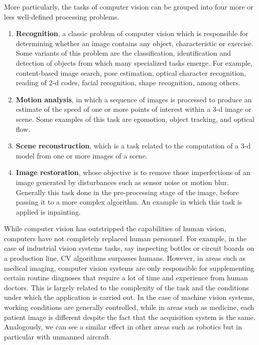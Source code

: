 More particularly, the tasks of computer vision can be grouped into four more or less well-defined processing problems.

\begin{enumerate}[label=\roman*]
	\item \textbf{Recognition}, a classic problem of computer vision which is responsible for determining whether an image contains any object, characteristic or exercise. Some variants of this problem are the classification, identification and detection of objects from which many specialized tasks emerge. For example, content-based image search, pose estimation, optical character recognition, reading of 2-d codes, facial recognition, shape recognition, among others.
	\item \textbf{Motion analysis}, in which a sequence of images is processed to produce an estimate of the speed of one or more points of interest within a 3-d image or scene. Some examples of this task are egomotion, object tracking, and optical flow.
	\item \textbf{Scene reconstruction}, which is a task related to the computation of a 3-d model from one or more images of a scene.
	\item \textbf{Image restoration}, whose objective is to remove those imperfections of an image generated by disturbances such as sensor noise or motion blur. Generally this task done in the pre-processing stage of the image, before passing it to a more complex algorithm. An example in which this task is applied is inpainting.
\end{enumerate}

While computer vision has outstripped the capabilities of human vision, computers have not completely replaced human personnel. For example, in the case of industrial vision systems tasks, say inspecting bottles or circuit boards on a production line, CV algorithms surpasses humans. However, in areas such as medical imaging, computer vision systems are only responsible for supplementing certain routine diagnoses that require a lot of time and experience from human doctors. This is largely related to the complexity of the task and the conditions under which the application is carried out. In the case of machine vision systems, working conditions are generally controlled, while in areas such as medicine, each patient image is different despite the fact that the acquisition system is the same. Analogously, we can see a similar effect in other areas such as robotics but in particular with unmanned aircraft.

